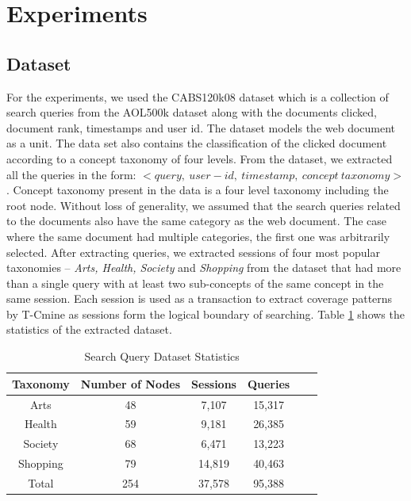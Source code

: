 \section{Experiments}
\label{ch5Experiments}

\subsection{Dataset}

For the experiments, we used the CABS120k08 \cite{CABSDATA} dataset which is a collection of search queries from the AOL500k dataset along with the documents clicked, document rank, timestamps and user id. The dataset models the web document as a unit. The data set also contains the classification of the clicked document according to a concept taxonomy of four levels. From the dataset, we extracted all the queries in the form: $ <query,\ user-id,\ timestamp,\ concept\ taxonomy> $. Concept taxonomy present in the data is a four level taxonomy including the root node. Without loss of generality, we assumed that the search queries related to the documents also have the same category as the web document. The case where the same document had multiple categories, the first one was arbitrarily selected. After extracting queries, we extracted sessions of four most popular taxonomies -- {\it Arts, Health, Society} and {\it Shopping} from the dataset that had more than a single query with at least two sub-concepts of the same concept in the same session. Each session is used as a transaction to extract coverage patterns by T-Cmine as sessions form the logical boundary of searching. Table \ref{table:trainingSetStats} shows the statistics of the extracted dataset. 

\begin{table}
\centering
\caption{Search Query Dataset Statistics \label{table:trainingSetStats}}

\begin{tabular}{|c|c|c|c|c|c|} \hline
Taxonomy & Number of Nodes & Sessions & Queries  \\ \hline
Arts & 48 &7,107 & 15,317  \\ \hline
Health & 59 & 9,181 & 26,385 \\ \hline
Society & 68 & 6,471 & 13,223\\ \hline
Shopping & 79 &14,819 & 40,463 \\ \hline
Total & 254 &37,578 & 95,388 \\ \hline
\end{tabular}
\end{table}

